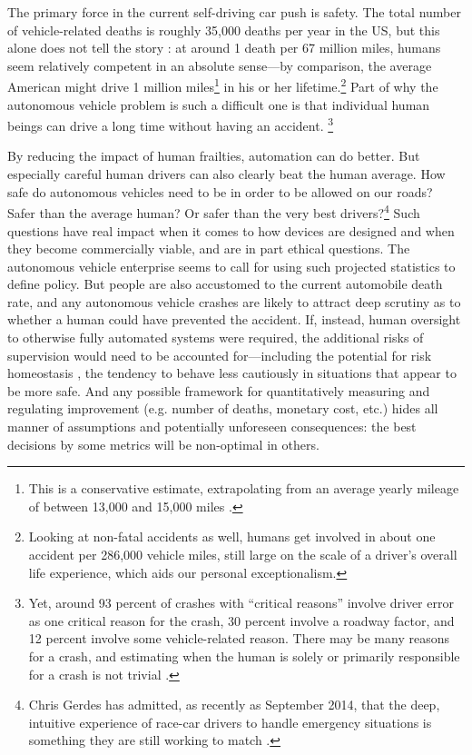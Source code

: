 The primary force in the current self-driving car
push is safety. The total number of vehicle-related deaths is 
roughly 35,000 deaths per year in the US, but this alone 
does not tell the story \cite{censusDeaths}: at around 1 death per 67
million miles, humans seem relatively 
competent in an absolute sense---by comparison, the average American might
drive 1 million miles\footnote{This is a conservative estimate,
  extrapolating from an average yearly mileage of between 13,000 and
  15,000 miles \cite{fhwa}.} in his or her lifetime.\footnote{Looking at non-fatal
accidents as well, humans get involved in about one accident per
286,000 vehicle miles, still large on the scale of a driver's overall
life experience, which aids our personal exceptionalism.} Part of why
the autonomous vehicle problem is 
such a difficult one is that individual human beings can drive a long
time without having an accident. \footnote{Yet, around 93 percent of crashes with ``critical
  reasons'' involve driver error as one critical reason for the crash, 30 percent involve a roadway factor, and 12 percent involve some
vehicle-related reason. There may be many reasons for a crash, and
estimating when the human is solely or primarily responsible for a
crash is not trivial \cite{NHTSAcrash}.}


By reducing the impact of human
frailties, automation can do better. But especially careful human
drivers can also clearly beat the human average. How safe do
autonomous vehicles need to be in order to be allowed on our roads?
Safer than the average human? Or safer than the very best
drivers?\footnote{Chris Gerdes has admitted, as recently as September
  2014, that the deep, intuitive experience of race-car drivers to
  handle emergency situations is something they are still working to
  match \cite{8truthsandmyths}.}
Such questions have real impact when it comes to how devices are
designed and when they become commercially viable, and are in
part ethical questions. The autonomous
vehicle enterprise seems to call for using such projected statistics
to define policy. But
people are also accustomed to the current automobile death rate, and
any autonomous vehicle crashes are likely to attract deep
scrutiny as
to whether a human could have prevented the accident. If,
instead, human oversight to otherwise fully automated systems were
required, the additional risks of supervision would need to be
accounted for---including the potential for risk homeostasis
\cite{Wilde}, the tendency to
behave less cautiously in situations that appear to be more safe. And
any possible framework for 
  quantitatively measuring and regulating improvement (e.g. number of deaths,
  monetary cost, etc.) hides all manner of assumptions and 
  potentially unforeseen consequences: the best decisions by some
  metrics will be non-optimal in others. 

